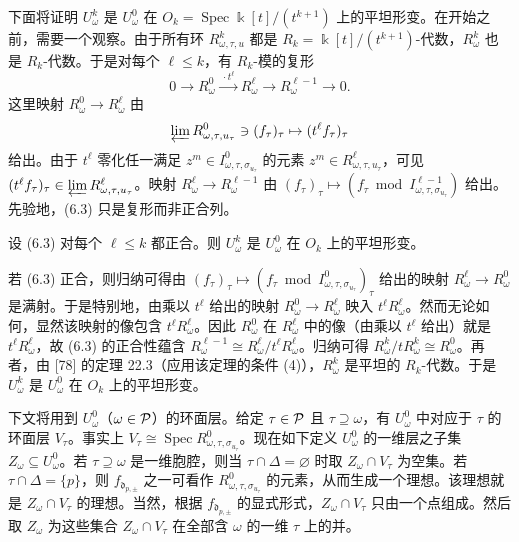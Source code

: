 下面将证明 $U^k_\omega$ 是 $U^0_\omega$ 在 $O_k=\operatorname{Spec}\Bbbk[t]/(t^{k+1})$ 上的平坦形变。在开始之前，需要一个观察。由于所有环 $R^k_{\omega,\tau,u}$ 都是 $R_k=\Bbbk[t]/(t^{k+1})$-代数，$R^k_\omega$ 也是 $R_k$-代数。于是对每个 $\ell\le k$，有 $R_k$-模的复形
\begin{equation}
  0\to R^0_\omega\xrightarrow{\ \cdot t^\ell\ }R^\ell_\omega
  \to R^{\ell-1}_\omega\to 0. \tag{6.3}
\end{equation}
这里映射 $R^0_\omega\to R^\ell_\omega$ 由
\[
  \varprojlim R^0_{\omega,\tau,u_\tau}\ni(f_\tau)_\tau
  \mapsto(t^\ell f_\tau)_\tau
\]
给出。由于 $t^\ell$ 零化任一满足 $z^m\in I^0_{\omega,\tau,\sigma_{u_\tau}}$ 的元素 $z^m\in R^\ell_{\omega,\tau,u_\tau}$，可见 $(t^\ell f_\tau)_\tau\in\varprojlim R^\ell_{\omega,\tau,u_\tau}$。映射 $R^\ell_\omega\to R^{\ell-1}_\omega$ 由 $(f_\tau)_\tau\mapsto(f_\tau\bmod I^{\ell-1}_{\omega,\tau,\sigma_{u_\tau}})$ 给出。先验地，(6.3) 只是复形而非正合列。


\begin{lemma}
设 (6.3) 对每个 $\ell\le k$ 都正合。则 $U^k_\omega$ 是 $U^0_\omega$ 在 $O_k$ 上的平坦形变。
\end{lemma}

若 (6.3) 正合，则归纳可得由 $(f_\tau)_\tau\mapsto(f_\tau\bmod I^0_{\omega,\tau,\sigma_{u_\tau}})_\tau$ 给出的映射 $R^\ell_\omega\to R^0_\omega$ 是满射。于是特别地，由乘以 $t^\ell$ 给出的映射 $R^0_\omega\to R^\ell_\omega$ 映入 $t^\ell R^\ell_\omega$。然而无论如何，显然该映射的像包含 $t^\ell R^\ell_\omega$。因此 $R^0_\omega$ 在 $R^\ell_\omega$ 中的像（由乘以 $t^\ell$ 给出）就是 $t^\ell R^\ell_\omega$，故 (6.3) 的正合性蕴含 $R^{\ell-1}_\omega\cong R^\ell_\omega/t^\ell R^\ell_\omega$。归纳可得 $R^k_\omega/tR^k_\omega\cong R^0_\omega$。再者，由 [78] 的定理 22.3（应用该定理的条件 (4)），$R^k_\omega$ 是平坦的 $R_k$-代数。于是 $U^k_\omega$ 是 $U^0_\omega$ 在 $O_k$ 上的平坦形变。

下文将用到 $U^0_\omega$（$\omega\in\mathcal{P}$）的环面层。给定 $\tau\in\mathcal{P}$ 且 $\tau\supseteq\omega$，有 $U^0_\omega$ 中对应于 $\tau$ 的环面层 $V_\tau$。事实上 $V_\tau\cong\operatorname{Spec}R^0_{\omega,\tau,\sigma_{u_\tau}}$。现在如下定义 $U^0_\omega$ 的一维层之子集 $Z_\omega\subseteq U^0_\omega$。若 $\tau\supseteq\omega$ 是一维胞腔，则当 $\tau\cap\Delta=\varnothing$ 时取 $Z_\omega\cap V_\tau$ 为空集。若 $\tau\cap\Delta=\{p\}$，则 $f_{\mathfrak d_{p,\pm}}$ 之一可看作 $R^0_{\omega,\tau,\sigma_{u_\tau}}$ 的元素，从而生成一个理想。该理想就是 $Z_\omega\cap V_\tau$ 的理想。当然，根据 $f_{\mathfrak d_{p,\pm}}$ 的显式形式，$Z_\omega\cap V_\tau$ 只由一个点组成。然后取 $Z_\omega$ 为这些集合 $Z_\omega\cap V_\tau$ 在全部含 $\omega$ 的一维 $\tau$ 上的并。

